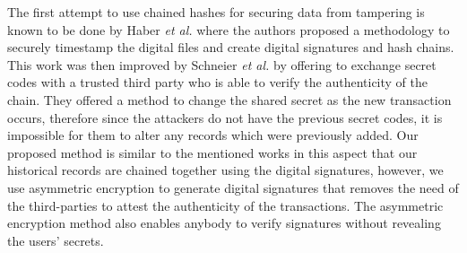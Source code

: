 		The first attempt to use chained hashes for securing data from tampering is known to be done by Haber {\it et al.} \cite{haber1991how} where the authors proposed a methodology to securely timestamp the digital files and create digital signatures and hash chains. This work was then improved by Schneier {\it et al.} \cite{schneier1998cryptoraphic} \cite{schneier1999minimizing} \cite{schneier1999secure} by offering to exchange secret codes with a trusted third party who is able to verify the authenticity of the chain. They offered a method to change the shared secret as the new transaction occurs, therefore since the attackers do not have the previous secret codes, it is impossible for them to alter any records which were previously added. Our proposed method is similar to the mentioned works in this aspect that our historical records are chained together using the digital signatures, however, we use asymmetric encryption to generate digital signatures that removes the need of the third-parties to attest the authenticity of the transactions. The asymmetric encryption method also enables anybody to verify signatures without revealing the users' secrets.